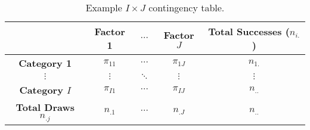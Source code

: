 \documentclass{article}
\begin{document}
\begin{table}[H]
    \centering
    \begin{tabular}{c c c c c}
        \toprule
                                        & \textbf{Factor 1} & \(\cdots\) & \textbf{Factor \(J\)} & \textbf{Total Successes (\(n_{i.}\))} \\
        \midrule
        \textbf{Category 1}             & \(\pi_{11}\)      & \(\cdots\) & \(\pi_{1J}\)          & \(n_{1.}\)                            \\
        \(\vdots\)                      & \(\vdots\)        & \(\ddots\) & \(\vdots\)            & \(\vdots\)                            \\
        \textbf{Category \(I\)}         & \(\pi_{I1}\)      & \(\cdots\) & \(\pi_{IJ}\)          & \(n_{..}\)                            \\
        \textbf{Total Draws \(n_{.j}\)} & \(n_{.1}\)        & \(\cdots\) & \(n_{.J}\)            & \(n_{..}\)                            \\
        \bottomrule
    \end{tabular}
    \caption{Example \(I \times J\) contingency table.} %
\end{table}
\end{document}
